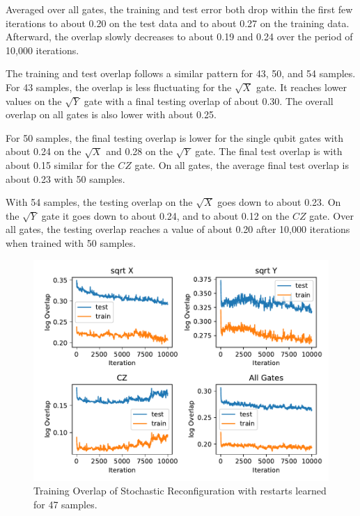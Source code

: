 Averaged over all gates, the training and test error both drop within the first few iterations to about 
0.20 on the test data and to about 0.27 on the training data. Afterward, the overlap slowly decreases to about 0.19 and 
0.24 over the period of 10,000 iterations.

The training and test overlap follows a similar pattern for 43, 50, and 54 samples. For 43 samples, the 
overlap is less fluctuating for the $\sqrt{X}$ gate. It reaches lower values on the $\sqrt{Y}$ gate with 
a final testing overlap of about 0.30. The overall overlap on all gates is also lower with about 0.25.

For 50 samples, the final testing overlap is lower for the single qubit gates with about 0.24 on the $\sqrt{X}$
and 0.28 on the $\sqrt{Y}$ gate. The final test overlap is with about 0.15 similar for the $CZ$ gate. On all gates, 
the average final test overlap is about 0.23 with 50 samples.

With 54 samples, the testing overlap on the $\sqrt{X}$ goes down to about 0.23. On the $\sqrt{Y}$ gate it goes 
down to about 0.24, and to about 0.12 on the $CZ$ gate. Over all gates, the testing overlap reaches a value of about 
0.20 after 10,000 iterations when trained with 50 samples.

\begin{figure}[H]
  \centering
  \includegraphics[width=\textwidth]{figures/results/SR-restarts-learned/avgOverlap_47.pdf}
  \caption[Training overlap of Stochastic Reconfiguration with restarts learned]{Training 
  Overlap of Stochastic Reconfiguration with restarts learned for 47 samples.}
  \label{fig:sr_restarts_overlap_47}
\end{figure}

